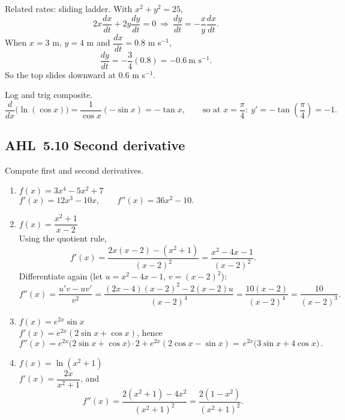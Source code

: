 \documentclass[11pt]{article}
\def\textbf#1{#1}%
\newcommand{\tocsubsection}[1]{\subsection{#1}}
\begin{document}
\begin{solution}
\textbf{Related rates: sliding ladder.} With $x^{2}+y^{2}=25$,
\[
2x\frac{dx}{dt}+2y\frac{dy}{dt}=0\ \Rightarrow\ \frac{dy}{dt}=-\frac{x}{y}\frac{dx}{dt}.
\]
When $x=3$ m, $y=4$ m and $\dfrac{dx}{dt}=0.8$ m s$^{-1}$,
\[
\frac{dy}{dt}=-\frac{3}{4}(0.8)=-0.6\ \text{m s}^{-1}.
\]
So the top slides downward at $0.6$ m s$^{-1}$.
\end{solution}

\begin{solution}
\textbf{Log and trig composite.}
\[
\frac{d}{dx}\big(\ln(\cos x)\big)=\frac{1}{\cos x}(-\sin x)=-\tan x,
\qquad
\text{so at }x=\frac{\pi}{4}:\ y'=-\tan\!\left(\frac{\pi}{4}\right)=-1.
\]
\end{solution}

\tocsubsection{AHL 5.10 Second derivative}


\begin{solution}
\textbf{Compute first and second derivatives.}
\begin{enumerate}
  \item $f(x)=3x^{4}-5x^{2}+7$\\[2pt]
  $f'(x)=12x^{3}-10x,\qquad f''(x)=36x^{2}-10.$

  \item $f(x)=\dfrac{x^{2}+1}{x-2}$\\[2pt]
  Using the quotient rule,
  \[
  f'(x)=\frac{2x(x-2)-(x^{2}+1)}{(x-2)^{2}}
       =\frac{x^{2}-4x-1}{(x-2)^{2}}.
  \]
  Differentiate again (let $u=x^{2}-4x-1$, $v=(x-2)^{2}$):
  \[
  f''(x)=\frac{u'v-uv'}{v^{2}}
        =\frac{(2x-4)(x-2)^{2}-2(x-2)u}{(x-2)^{4}}
        =\frac{10(x-2)}{(x-2)^{4}}
        =\boxed{\frac{10}{(x-2)^{3}}}.
  \]

  \item $f(x)=e^{2x}\sin x$\\[2pt]
  $f'(x)=e^{2x}(2\sin x+\cos x)$, hence
  \[
  f''(x)=e^{2x}\big(2\sin x+\cos x\big)\cdot 2+e^{2x}(2\cos x-\sin x)
        =\boxed{\,e^{2x}\big(3\sin x+4\cos x\big)\,}.
  \]

  \item $f(x)=\ln(x^{2}+1)$\\[2pt]
  $f'(x)=\dfrac{2x}{x^{2}+1}$, and
  \[
  f''(x)=\frac{2(x^{2}+1)-4x^{2}}{(x^{2}+1)^{2}}
        =\boxed{\frac{2(1-x^{2})}{(x^{2}+1)^{2}}}.
  \]
\end{enumerate}
\end{solution}
\end{document}
